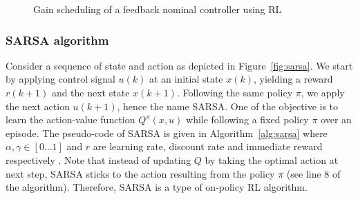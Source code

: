 \begin{figure}
	\caption{Gain scheduling of a feedback nominal controller using \acs {RL}}
	\label{fig:dynamictuning}	
\end{figure}

	\subsubsection{\acs{SARSA} algorithm} 
	Consider a sequence of state and action as depicted in Figure~\ref{fig:sarsa}. We start by applying control signal $ u(k) $ at an initial state $ x(k) $, yielding a reward $ r(k+1) $ and the next state $ x(k+1)$. Following the same policy $\pi$, we apply the next action $ u(k+1) $, hence the name \acs {SARSA}. One of the objective is to learn the action-value function $ Q^{\pi}(x,u) $ while following a fixed policy $ \pi $ over an episode. The pseudo-code of \acs{SARSA} is given in Algorithm~\ref{alg:sarsa} where $ \alpha, \gamma \in [0 \dots 1]$ and $r$ are learning rate, discount rate and immediate reward respectively \cite{sutton1998reinforcement}. Note that instead of updating $Q$ by taking the optimal action at next step, \acs {SARSA} sticks to the action resulting from the policy $\pi$ (see line 8 of the algorithm). Therefore, \acs {SARSA} is a type of on-policy \acs {RL} algorithm.
	
